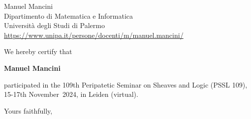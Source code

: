 \documentclass[
  fontsize=11pt,
  paper=a4,
  parskip=half,
  enlargefirstpage=on,    %
  fromalign=right,        %
  fromlogo=on,
  fromrule=off,     %
  addrfield=on,           %
  backaddress=off,         %
  subject=beforeopening,  %
  locfield=off,        %
  foldmarks=off,           %
  pagenumber=off
]{scrlttr2}
\begin{document}
\begin{letter}{%
    Manuel Mancini \\
    Dipartimento di Matematica e Informatica \\
    Universit\`{a} degli Studi di Palermo \\
    \url{https://www.unipa.it/persone/docenti/m/manuel.mancini/}
  }
  \opening{}

  We hereby certify that
  \begin{center}
    \textbf{Manuel Mancini}
  \end{center}
  participated in the 109th Peripatetic Seminar on Sheaves and Logic
  (PSSL 109), 15-17th November~2024, in Leiden (virtual). 
  
\vfill
\closing{Yours faithfully,}
\end{letter}
\end{document}
